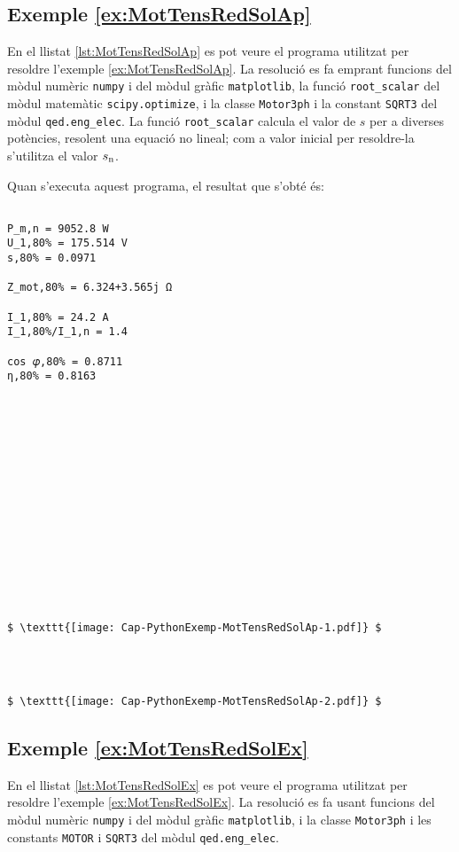 \hypertarget{exemple:MotTensRedSolAp}{\subsection{Exemple \ref*{ex:MotTensRedSolAp} \MotTensRedSolAp}}
En el llistat \vref{lst:MotTensRedSolAp} es pot veure el programa utilitzat per resoldre l'exemple \vref{ex:MotTensRedSolAp}. La resolució es fa emprant funcions del mòdul numèric \texttt{numpy} i del mòdul gràfic \texttt{matplotlib}, la funció \texttt{root\_scalar} del mòdul matemàtic \texttt{scipy.optimize}, i la classe \texttt{Motor3ph}  i la constant  \texttt{SQRT3} del mòdul \texttt{qed.eng\_elec}. La funció \texttt{root\_scalar} calcula el valor de $s$ per a diverses potències, resolent una equació no lineal; com a valor inicial per resoldre-la  s'utilitza el valor $s_\mathrm{n}$.


Quan s'executa aquest programa, el resultat que s'obté és:
\lstset{
	language=,
	numbers=none,
	frame=none
}
\begin{lstlisting}[mathescape=true]
	
P_m,n = 9052.8 W
U_1,80% = 175.514 V
s,80% = 0.0971

Z_mot,80% = 6.324+3.565j Ω

I_1,80% = 24.2 A
I_1,80%/I_1,n = 1.4

cos 𝜑,80% = 0.8711
η,80% = 0.8163
	
	
	
	
	
	
	
	
	
	
	
	
	
	
	
	
$ \texttt{[image: Cap-PythonExemp-MotTensRedSolAp-1.pdf]} $




$ \texttt{[image: Cap-PythonExemp-MotTensRedSolAp-2.pdf]} $
\end{lstlisting} 



\hypertarget{exemple:MotTensRedSolEx}{\subsection{Exemple \ref*{ex:MotTensRedSolEx} \MotTensRedSolEx}}
En el llistat \vref{lst:MotTensRedSolEx} es pot veure el programa utilitzat per resoldre l'exemple \vref{ex:MotTensRedSolEx}. La resolució es fa usant funcions del mòdul numèric \texttt{numpy} i del mòdul gràfic \texttt{matplotlib},  i la classe \texttt{Motor3ph} i les constants \texttt{MOTOR} i \texttt{SQRT3} del mòdul \texttt{qed.eng\_elec}.


